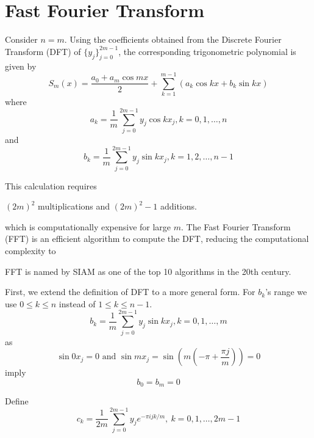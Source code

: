 
\section{Fast Fourier Transform}

\begin{definition}
    Consider $n = m$. Using the coefficients obtained from the Discrete Fourier Transform (DFT) of $\{y_j\}_{j=0}^{2m-1}$, the corresponding trigonometric polynomial is given by \[
        S_m(x) = \frac{a_0 + a_m \cos mx}{2} + \sum_{k=1}^{m-1} (a_k \cos kx + b_k \sin kx)
    \]
    where \begin{equation}
        a_k = \frac{1}{m} \sum_{j=0}^{2m-1} y_j \cos k x_j, k = 0, 1, \dots, n \label{eq:ak}
    \end{equation}
    and \begin{equation}
        b_k = \frac{1}{m} \sum_{j=0}^{2m-1} y_j \sin k x_j, k = 1, 2, \dots, n-1 \label{eq:bk}
    \end{equation}
\end{definition}

This calculation requires \begin{center}
    $(2m)^2$ multiplications and $(2m)^2 - 1$ additions.
\end{center}
which is computationally expensive for large $m$. The Fast Fourier Transform (FFT) is an efficient algorithm to compute the DFT, reducing the computational complexity to \begin{center}
\end{center}

\begin{note}
    FFT is named by SIAM as one of the top 10 algorithms in the 20th century.
\end{note}

First, we extend the definition of DFT to a more general form. For $b_k$'s range we use $0 \le k \le n$ instead of $1 \le k \le n-1$. \[
    b_k = \frac{1}{m} \sum_{j=0}^{2m-1} y_j \sin k x_j, k = 0, 1, \dots, m
\]
as \[
    \sin 0 x_j = 0 \mbox{ and } \sin m x_j = \sin \left(m \left( -\pi + \frac{\pi j}{m} \right)\right) = 0
\]
imply \[
    b_0 = b_m = 0
\]

\begin{definition}
    Define \begin{equation}
        c_k = \frac{1}{2m} \sum_{j=0}^{2m-1} y_j e^{-\pi i j k /m},\ k = 0, 1, \dots, 2m-1 \label{eq:ck}
    \end{equation}
\end{definition}

